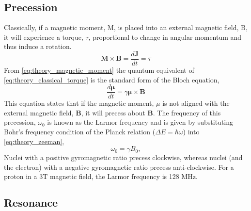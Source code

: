 \subsection{Precession}

Classically, if a magnetic moment, M, is placed into an external magnetic field, B, it will experience a torque, $\tau$, proportional to change in angular momentum and thus induce a rotation.
\begin{equation}
\mathbf{M \times B} = \frac{d\mathbf{J}}{dt} = \tau
\label{eq:theory_classical_torque}
\end{equation}
From \eqref{eq:theory_magnetic_moment} the quantum equivalent of \eqref{eq:theory_classical_torque} is the standard form of the Bloch equation\cite{bloch_nuclear_1946},
\begin{equation}
\frac{d\mathbf{\mu}}{dt} = \gamma \mathbf{\mu \times B}
\label{eq:theory_bloch_standard}
\end{equation}
This equation states that if the magnetic moment, $\mu$ is not aligned with the external magnetic field, $\mathbf{B}$, it will precess about $\mathbf{B}$. The frequency of this precession, $\omega_0$ is known as the Larmor frequency and is given by substituting Bohr's frequency condition of the Planck relation ($\Delta E = \hbar \omega $) into \eqref{eq:theory_zeeman},
\begin{equation}
\omega_0=\gamma B_0,
\label{eq:theory_larmor}
\end{equation}
Nuclei with a positive gyromagnetic ratio precess clockwise, whereas nuclei (and the electron) with a negative gyromagnetic ratio precess anti-clockwise. For a proton in a 3T magnetic field, the Larmor frequency is 128 MHz.

\subsection{Resonance}

